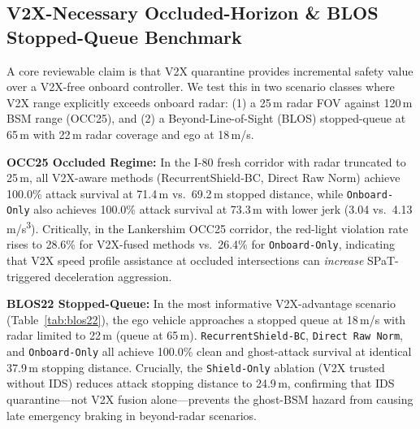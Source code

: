 \documentclass[journal]{IEEEtran}
\begin{document}
\subsection{V2X-Necessary Occluded-Horizon \& BLOS Stopped-Queue Benchmark}
\label{sec:v2x_necessary}
A core reviewable claim is that V2X quarantine provides incremental safety value over a V2X-free onboard controller. We test this in two scenario classes where V2X range explicitly exceeds onboard radar: (1) a 25\,m radar FOV against 120\,m BSM range (OCC25), and (2) a Beyond-Line-of-Sight (BLOS) stopped-queue at 65\,m with 22\,m radar coverage and ego at 18\,m/s.

\textbf{OCC25 Occluded Regime:} In the I-80 fresh corridor with radar truncated to 25\,m, all V2X-aware methods (RecurrentShield-BC, Direct Raw Norm) achieve 100.0\% attack survival at 71.4\,m vs.\ 69.2\,m stopped distance, while \texttt{Onboard-Only} also achieves 100.0\% attack survival at 73.3\,m with lower jerk (3.04 vs.\ 4.13\,m/s\textsuperscript{3}). Critically, in the Lankershim OCC25 corridor, the red-light violation rate rises to 28.6\% for V2X-fused methods vs.\ 26.4\% for \texttt{Onboard-Only}, indicating that V2X speed profile assistance at occluded intersections can \emph{increase} SPaT-triggered deceleration aggression.

\textbf{BLOS22 Stopped-Queue:} In the most informative V2X-advantage scenario (Table~\ref{tab:blos22}), the ego vehicle approaches a stopped queue at 18\,m/s with radar limited to 22\,m (queue at 65\,m). \texttt{RecurrentShield-BC}, \texttt{Direct Raw Norm}, and \texttt{Onboard-Only} all achieve 100.0\% clean and ghost-attack survival at identical 37.9\,m stopping distance. Crucially, the \texttt{Shield-Only} ablation (V2X trusted without IDS) reduces attack stopping distance to 24.9\,m, confirming that IDS quarantine---not V2X fusion alone---prevents the ghost-BSM hazard from causing late emergency braking in beyond-radar scenarios.

\begin{table}[t]
\centering
\caption{BLOS22 Stopped-Queue: 18\,m/s Ego, Radar=22\,m, Queue@65\,m}
\label{tab:blos22}
\scriptsize
\setlength{\tabcolsep}{2.0pt}
\end{table}
\end{document}
